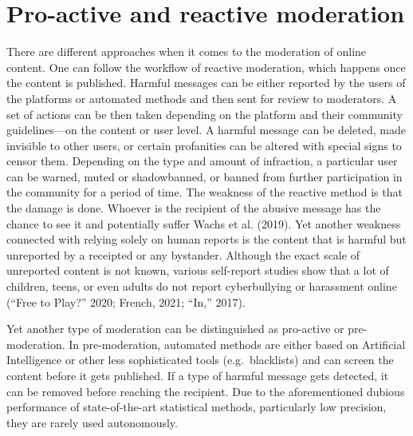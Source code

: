 \documentclass[
  10pt,
  dvipsnames,enabledeprecatedfontcommands]{scrartcl}
\begin{document}
\hypertarget{pro-active-and-reactive-moderation}{%
\section{Pro-active and reactive
moderation}\label{pro-active-and-reactive-moderation}}

There are different approaches when it comes to the moderation of online
content. One can follow the workflow of reactive moderation, which
happens once the content is published. Harmful messages can be either
reported by the users of the platforms or automated methods and then
sent for review to moderators. A set of actions can be then taken
depending on the platform and their community guidelines---on the
content or user level. A harmful message can be deleted, made invisible
to other users, or certain profanities can be altered with special signs
to censor them. Depending on the type and amount of infraction, a
particular user can be warned, muted or shadowbanned, or banned from
further participation in the community for a period of time. The
weakness of the reactive method is that the damage is done. Whoever is
the recipient of the abusive message has the chance to see it and
potentially suffer Wachs et al. (2019). Yet another weakness connected
with relying solely on human reports is the content that is harmful but
unreported by a receipted or any bystander. Although the exact scale of
unreported content is not known, various self-report studies show that a
lot of children, teens, or even adults do not report cyberbullying or
harassment online ({``Free to {Play}?''} 2020; French, 2021; {``In,''}
2017).

Yet another type of moderation can be distinguished as pro-active or
pre-moderation. In pre-moderation, automated methods are either based on
Artificial Intelligence or other less sophisticated tools
(e.g.~blacklists) and can screen the content before it gets published.
If a type of harmful message gets detected, it can be removed before
reaching the recipient. Due to the aforementioned dubious performance of
state-of-the-art statistical methods, particularly low precision, they
are rarely used autonomously.
\end{document}
